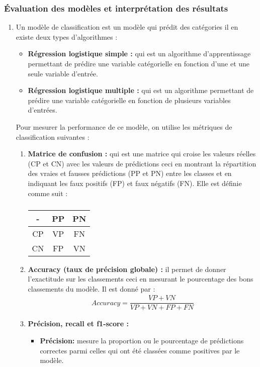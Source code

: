 \documentclass[a4paper, 12pt]{article}
\begin{document}
	\subsubsection{	Évaluation des modèles et interprétation des résultats}
	\begin{enumerate}
		\item \justifying Un modèle de classification est un modèle qui prédit des catégories  il en existe deux types d’algorithmes :
		\begin{itemize}
			\item \justifying \textbf{Régression logistique simple : } qui est un algorithme d’apprentissage permettant de prédire une variable catégorielle en fonction d’une et une seule variable d’entrée.
			\item \justifying \textbf{Régression logistique multiple :} qui est un algorithme permettant de prédire une variable catégorielle en fonction de plusieurs variables d’entrées.
		\end{itemize} \justifying
		Pour mesurer la performance de ce modèle, on utilise les métriques de classification suivantes :
		\begin{enumerate}
			\item \justifying \textbf{Matrice de confusion : } qui est une matrice qui croise les valeurs réelles (CP et CN) avec les valeurs de prédictions ceci en montrant  la répartition des vraies et fausses prédictions (PP et PN) entre les classes et en indiquant les faux positifs (FP) et faux négatifs (FN). Elle est définie comme suit :
			\subparagraph{}
			\centering
			\begin{tabular}	{|c|c|c|}
				\hline \rowcolor{cyan} - & PP & PN\\ \hline
				CP & VP & FN \\
				\hline
				CN & FP & VN \\
				\hline
			\end{tabular}
			\item \justifying \textbf{Accuracy (taux de précision globale) : } il permet de donner l’exactitude sur les classements  ceci en mesurant le pourcentage des bons classements du modèle. Il est donné par :
			\\ \centering
			\begin{align*}
				Accuracy=\dfrac{VP+VN}{VP+VN+FP+FN}
			\end{align*} 
			\item \justifying \textbf{Précision, recall et f1-score : } 
			\begin{itemize}
				\item \justifying	\textbf{Précision: } mesure la proportion ou le pourcentage de prédictions correctes parmi celles qui ont été classées comme positives par le modèle.\\

\end{itemize}
\end{enumerate}
\end{enumerate}
\end{document}
